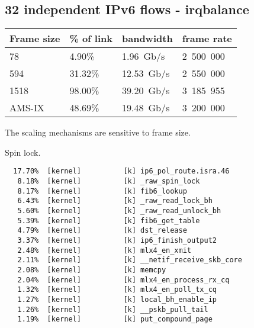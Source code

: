 
\subsection{32 independent IPv6 flows - irqbalance}

\begin{tabular}{ | l | l | l | l | }
\hline
Frame size & \% of link & bandwidth & frame rate \\
\hline
78     &  4.90\% &  1.96~Gb/s & 2~500~000 \\
594    & 31.32\% & 12.53~Gb/s & 2~550~000 \\
1518   & 98.00\% & 39.20~Gb/s & 3~185~955 \\
AMS-IX & 48.69\% & 19.48~Gb/s & 3~200~000 \\
\hline
\end{tabular}

The scaling mechanisms are sensitive to frame size.

Spin lock.

\begin{lstlisting}
  17.70%  [kernel]          [k] ip6_pol_route.isra.46
   8.18%  [kernel]          [k] _raw_spin_lock
   8.17%  [kernel]          [k] fib6_lookup
   6.43%  [kernel]          [k] _raw_read_lock_bh
   5.60%  [kernel]          [k] _raw_read_unlock_bh
   5.39%  [kernel]          [k] fib6_get_table
   4.79%  [kernel]          [k] dst_release
   3.37%  [kernel]          [k] ip6_finish_output2
   2.48%  [kernel]          [k] mlx4_en_xmit
   2.11%  [kernel]          [k] __netif_receive_skb_core
   2.08%  [kernel]          [k] memcpy
   2.04%  [kernel]          [k] mlx4_en_process_rx_cq
   1.32%  [kernel]          [k] mlx4_en_poll_tx_cq
   1.27%  [kernel]          [k] local_bh_enable_ip
   1.26%  [kernel]          [k] __pskb_pull_tail
   1.19%  [kernel]          [k] put_compound_page
\end{lstlisting}
